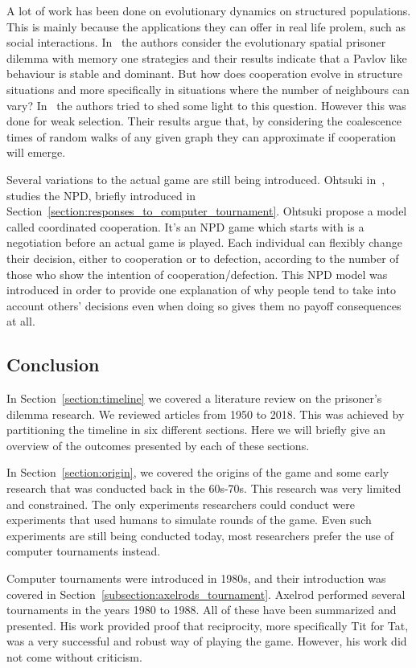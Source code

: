\documentclass{article}
\theoremstyle{definition}
\begin{document}
A lot of work has been done on evolutionary dynamics on structured populations.
This is mainly because the applications they can offer in real life prolem,
such as social interactions.
In~\cite{Liu2017} the authors consider the evolutionary spatial prisoner dilemma with
memory one strategies and their results indicate that a Pavlov like behaviour
is stable and dominant. But how does cooperation evolve in structure situations
and more specifically in situations where the number of neighbours can vary?
In~\cite{Allen2017} the authors tried to shed some light to this question.
However this was done for weak selection. Their results argue that, by considering
the coalescence times of random walks of any given graph they can approximate if
cooperation will emerge.

Several variations to the actual game are still being introduced. Ohtsuki in~\cite{Ohtsuki2018},
studies the NPD, briefly introduced in Section~\ref{section:responses_to_computer_tournament}.
Ohtsuki propose a model called coordinated cooperation. It's an NPD game
which starts with is a negotiation before an actual game is played. Each individual
can flexibly change their decision, either to cooperation or to defection,
according to the number of those who show the intention of cooperation/defection.
This NPD model was introduced in order to provide one explanation of why
people tend to take into account others' decisions even when doing so gives them
no payoff consequences at all.

\subsection{Conclusion}

In Section~\ref{section:timeline} we covered a literature review on the prisoner's
dilemma research. We reviewed articles from 1950 to 2018. This was achieved by
partitioning the timeline in six different sections. Here we will briefly give an
overview of the outcomes presented by each of these sections.

In Section~\ref{section:origin}, we covered the origins of the game and some early
research that was conducted back in the 60s-70s. This research was very limited
and constrained. The only experiments researchers could conduct were experiments
that used humans to simulate rounds of the game. Even such experiments are still
being conducted today, most researchers prefer the use of computer tournaments instead.

Computer tournaments were introduced in 1980s, and their introduction was
covered in Section~\ref{subsection:axelrods_tournament}. Axelrod performed several
tournaments in the years 1980 to 1988. All of these have been summarized and presented.
His work provided proof that reciprocity, more specifically Tit for Tat, was
a very successful and robust way of playing the game. However, his work did not
come without criticism.
\end{document}
